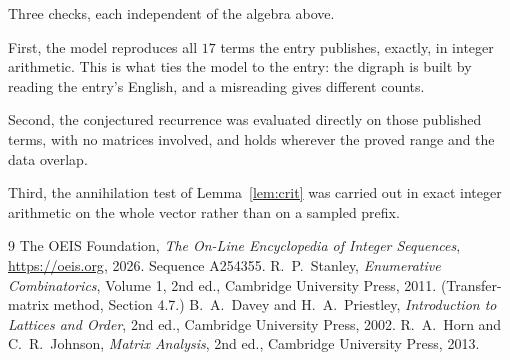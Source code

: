 \documentclass[11pt,a4paper]{article}
\theoremstyle{plain}
\theoremstyle{definition}
\begin{document}
Three checks, each independent of the algebra above.

First, the model reproduces all $17$ terms the entry publishes, exactly, in integer
arithmetic. This is what ties the model to the entry: the digraph is built by reading the
entry's English, and a misreading gives different counts.

Second, the conjectured recurrence was evaluated directly on those published terms, with no
matrices involved, and holds wherever the proved range and the data overlap.

Third, the annihilation test of Lemma~\ref{lem:crit} was carried out in exact integer
arithmetic on the whole vector rather than on a sampled prefix.

\begin{thebibliography}{9}
 The OEIS Foundation, \emph{The On-Line Encyclopedia of Integer
Sequences}, \url{https://oeis.org}, 2026. Sequence A254355.
 R.~P.~Stanley, \emph{Enumerative Combinatorics}, Volume 1, 2nd ed.,
Cambridge University Press, 2011. (Transfer-matrix method, Section 4.7.)
 B.~A.~Davey and H.~A.~Priestley, \emph{Introduction to Lattices and
Order}, 2nd ed., Cambridge University Press, 2002.
 R.~A.~Horn and C.~R.~Johnson, \emph{Matrix Analysis}, 2nd ed., Cambridge
University Press, 2013.
\end{thebibliography}
\end{document}
